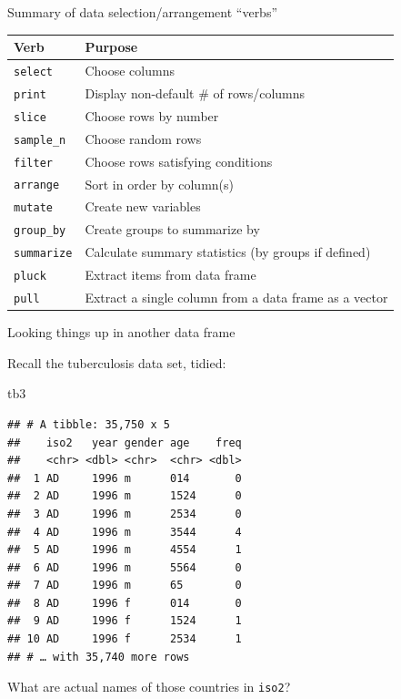 \documentclass[ignorenonframetext,]{beamer}
\newenvironment{Shaded}{\begin{snugshade}}{\end{snugshade}}
\newcommand{\NormalTok}[1]{#1}
\begin{document}
\begin{frame}{Summary of data selection/arrangement ``verbs''}
\protect\hypertarget{summary-of-data-selectionarrangement-verbs}{}

\begin{tabular}{lp{}}
    Verb & Purpose\\
    \hline
    \texttt{select} & Choose columns\\
    \texttt{print} & Display non-default \# of rows/columns \\
    \texttt{slice} & Choose rows by number\\
    \texttt{sample\_n} & Choose random rows\\ 
    \texttt{filter} & Choose rows satisfying conditions \\
    \texttt{arrange}& Sort in order by column(s) \\
    \texttt{mutate} & Create new variables\\
    \texttt{group\_by} & Create groups to summarize by\\
    \texttt{summarize} & Calculate summary statistics (by groups if defined)\\
    \texttt{pluck} & Extract items from data frame\\
    \texttt{pull} & Extract a single column from a data frame as a vector\\
    \hline
  \end{tabular}

\end{frame}

\begin{frame}[fragile]{Looking things up in another data frame}
\protect\hypertarget{looking-things-up-in-another-data-frame}{}

Recall the tuberculosis data set, tidied:

\begin{Shaded}
\begin{Highlighting}[]
\NormalTok{tb3}
\end{Highlighting}
\end{Shaded}

\begin{verbatim}
## # A tibble: 35,750 x 5
##    iso2   year gender age    freq
##    <chr> <dbl> <chr>  <chr> <dbl>
##  1 AD     1996 m      014       0
##  2 AD     1996 m      1524      0
##  3 AD     1996 m      2534      0
##  4 AD     1996 m      3544      4
##  5 AD     1996 m      4554      1
##  6 AD     1996 m      5564      0
##  7 AD     1996 m      65        0
##  8 AD     1996 f      014       0
##  9 AD     1996 f      1524      1
## 10 AD     1996 f      2534      1
## # … with 35,740 more rows
\end{verbatim}

What are actual names of those countries in \texttt{iso2}?

\end{frame}
\end{document}
